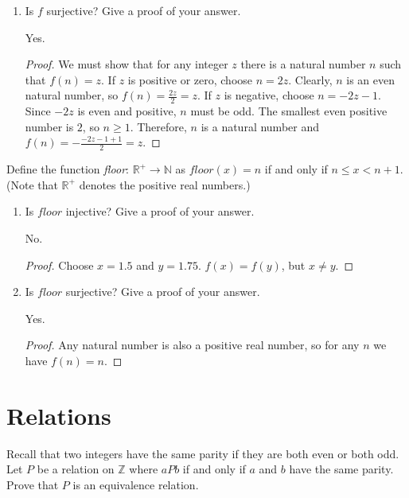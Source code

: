 \documentclass[]{exam}
\theoremstyle{definition}
\newcommand{\bb}[1]{\mathbb{#1}}
\newcommand{\Z}{\bb{Z}}
\newcommand{\R}{\bb{R}}
\newcommand{\N}{\bb{N}}
\begin{document}
\begin{questions}
\begin{enumerate}[label=\alph*)]
\begin{solution}
\end{solution}
\item Is $f$ surjective? Give a proof of your answer.
\begin{solution}
Yes.
\begin{proof}
We must show that for any integer $z$ there is a natural number $n$ such that
$f(n) = z$. If $z$ is positive or zero, choose $n = 2z$. Clearly, $n$ is an 
even natural number, so $f(n) = \frac{2z}{2} = z$. If $z$ is negative, 
choose $n = -2z - 1$. Since $-2z$ is even and positive, $n$ must be odd.
The smallest even positive number is $2$, so $n \geq 1$. Therefore, $n$
is a natural number and $f(n) = -\frac{-2z -1 + 1}{2} = z$.
\end{proof}
\end{solution}
\end{enumerate}

\question
Define the function \emph{floor}: $\R^+ \to \N$ as $floor(x) = n$ if and only if
$n \leq x < n+1$.(Note that $\R^+$ denotes the positive real numbers.)

\begin{enumerate}[label=\alph*)]
\item Is $floor$ injective? Give a proof of your answer. 
\begin{solution}
No.
\begin{proof}
Choose $x = 1.5$ and $y = 1.75$. $f(x) = f(y)$, but $x \neq y$.
\end{proof}
\end{solution}

\item Is $floor$ surjective? Give a proof of your answer.
\begin{solution}
Yes.
\begin{proof}
Any natural number is also a positive real number, so for any $n$ we have $f(n) = n$. 
\end{proof}
\end{solution}

\end{enumerate}

\section*{Relations}

\question Recall that two integers have the same parity if they are both
          even or both odd. Let $P$ be a relation on $\Z$ where $aPb$
          if and only if $a$ and $b$ have the same parity. Prove that
          $P$ is an equivalence relation.


\end{questions}
\end{document}
